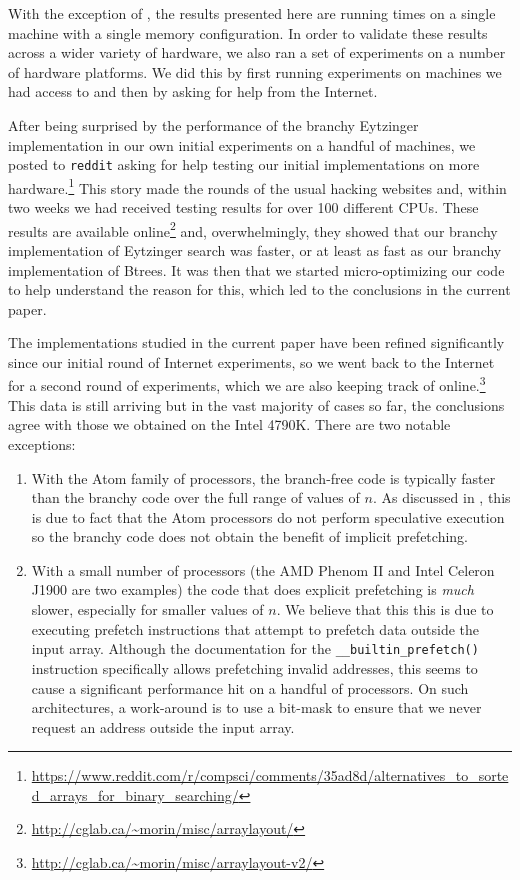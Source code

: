 \documentclass{patmorin}
\begin{document}
With the exception of , the results presented here are
running times on a single machine with a single memory configuration.
In order to validate these results across a wider variety of hardware,
we also ran a set of experiments on a number of hardware platforms. We
did this by first running experiments on machines we had access to and
then by asking for help from the Internet.

After being surprised by the performance of the branchy
Eytzinger implementation in our own initial experiments
on a handful of machines, we posted to \texttt{reddit}
asking for help testing our initial implementations on more 
hardware.\footnote{\url{https://www.reddit.com/r/compsci/comments/35ad8d/alternatives_to_sorted_arrays_for_binary_searching/}}
This story made the rounds of the usual hacking websites
and, within two weeks we had received testing results
for over 100 different CPUs.  These results are available
online\footnote{\url{http://cglab.ca/~morin/misc/arraylayout/}} and,
overwhelmingly, they showed that our branchy implementation of Eytzinger
search was faster, or at least as fast as our branchy implementation
of Btrees.  It was then that we started micro-optimizing our code to
help understand the reason for this, which led to the conclusions in
the current paper.

The implementations studied in the current paper have been
refined significantly since our initial round of Internet
experiments, so we went back to the Internet for a second
round of experiments, which we are also keeping track of
online.\footnote{\url{http://cglab.ca/~morin/misc/arraylayout-v2/}}
This data is still arriving but in the vast majority of cases so far,
the conclusions agree with those we obtained on the Intel 4790K.  There are two notable exceptions:
\begin{enumerate}
\item With the Atom family of processors, the branch-free code is
typically faster than the branchy code over the full range of values
of $n$.  As discussed in , this is due to
fact that the Atom processors do not perform speculative execution so
the branchy code does not obtain the benefit of implicit prefetching.

\item With a small number of processors (the AMD Phenom II and Intel
Celeron J1900 are two examples) the code that does explicit prefetching
is \emph{much} slower, especially for smaller values of $n$.  We believe
that this this is due to executing prefetch instructions that attempt
to prefetch data outside the input array.  Although the documentation
for the \texttt{__builtin_prefetch()} instruction specifically
allows prefetching invalid addresses, this seems to cause a significant
performance hit on a handful of processors.  On such architectures,
a work-around is to use a bit-mask to ensure that we never request an
address outside the input array.
\end{enumerate}
\end{document}
